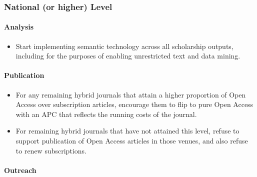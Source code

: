 \subsubsection{National (or higher)
Level}\label{national-or-higher-level}

\paragraph{Analysis}\label{analysis-2}

\begin{itemize}
\tightlist
\item
  Start implementing semantic technology across all scholarship outputs,
  including for the purposes of enabling unrestricted text and data
  mining.
\end{itemize}

\paragraph{Publication}\label{publication-4}

\begin{itemize}
\tightlist
\item
  For any remaining hybrid journals that attain a higher proportion of
  Open Access over subscription articles, encourage them to flip to pure
  Open Access with an APC that reflects the running costs of the
  journal.
\item
  For remaining hybrid journals that have not attained this level,
  refuse to support publication of Open Access articles in those venues,
  and also refuse to renew subscriptions.
\end{itemize}

\paragraph{Outreach}\label{outreach-4}

